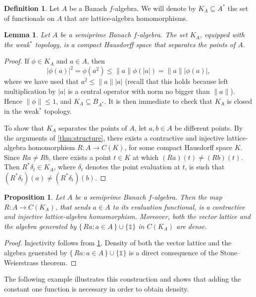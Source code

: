 \documentclass{memo-l}
\newtheorem{lem}[theorem]{Lemma}
\newtheorem{prop}[theorem]{Proposition}
\theoremstyle{definition}
\newtheorem{defn}[theorem]{Definition}
\theoremstyle{remark}
\numberwithin{section}{chapter}
\numberwithin{equation}{chapter}
\newcommand{\one}{\ensuremath{\mathbb{1}}}
\newcommand{\falg}{$f\!$-algebra}
\begin{document}
\begin{defn}
    Let $A$ be a Banach \falg. We will denote by $K_A\subseteq A^{*}$
    the set of functionals on $A$ that are lattice-algebra
    homomorphisms.
\end{defn}

\begin{lem}\label{lem:compact_sep_points}
    Let $A$ be a semiprime Banach \falg.
    The set $K_A$, equipped with the weak$^*$ topology, is a compact
    Hausdorff space that separates the points of $A$.
\end{lem}
\begin{proof}
    If $\phi \in K_A$ and $a \in A$, then
    \[
    |\phi (a)|^2=\phi (a^2)\le \|a\| \phi (|a|)=\|a\| |\phi (a)|,
    \]
    where we have used that $a^2\le \|a\| |a|$ (recall that this holds
    because left multiplication by $|a|$ is a central operator with
    norm no bigger than $\|a\|$). Hence $\|\phi \|\le 1$, and
    $K_A\subseteq B_{A^{*}}$. It is then immediate to check that $K_A$
    is closed in the weak$^*$ topology.

    To show that $K_A$ separates the points of $A$, let $a,b \in A$ be
    different points. By the arguments of \cref{thm:structure}, there
    exists a contractive and injective lattice-algebra homomorphism
    $R\colon A\to C(K)$, for some compact Hausdorff space $K$. Since
    $Ra \neq Rb$, there exists a point $t \in K$ at which $(Ra)(t)\neq
    (Rb)(t)$. Then $R^{*}\delta _t \in K_A$, where $\delta _t$ denotes
    the point evaluation at $t$, is such that $(R^{*}\delta _t)(a)\neq
    (R^{*}\delta _t)(b)$.
\end{proof}

\begin{prop}
    Let $A$ be a semiprime Banach \falg. Then the map $R\colon A\to
    C(K_A)$, that sends $a \in A$ to its evaluation functional, is a
    contractive and injective lattice-algebra homomorphism. Moreover, both
    the vector lattice and the algebra generated by $\{\, Ra : a \in A
    \, \} \cup \{\one\}$ in $C(K_A)$ are dense.
\end{prop}
\begin{proof}
    Injectivity follows from \cref{lem:compact_sep_points}. Density of both the vector lattice and the algebra generated by $\{\, Ra : a \in A
    \, \} \cup \{\one\}$ is a direct consequence of the Stone--Weierstrass theorem.
\end{proof}

The following example illustrates this construction and shows that
adding the constant one function is necessary in order to obtain density.
\end{document}
